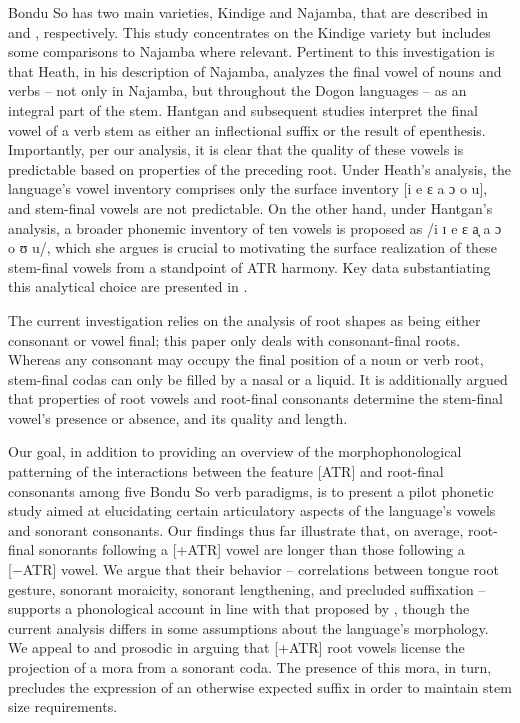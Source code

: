 \documentclass[output=paper,colorlinks,citecolor=brown]{langscibook}
\begin{document}
Bondu So has two main varieties, Kindige and Najamba, that are described in  \citet{hantgan2013kindigue} and \citet{HeathBS2017}, respectively. This study concentrates on the Kindige variety but includes some comparisons to Najamba where relevant. Pertinent to this investigation is that Heath, in his description of Najamba, analyzes the final vowel of nouns and verbs -- not only in Najamba, but throughout the Dogon languages -- as an integral part of the stem. Hantgan and subsequent studies \citep{HantganDavis, GreenHantgan} interpret the final vowel of a verb stem as either an inflectional suffix or the result of epenthesis. Importantly, per our analysis, it is clear that the quality of these vowels is predictable based on properties of the preceding root. Under Heath's analysis, the language's vowel inventory comprises only the surface inventory [i e ɛ a ɔ o u], and stem-final vowels are not predictable. On the other hand, under Hantgan's analysis, a broader phonemic inventory of ten vowels is proposed as /i ɪ e ɛ a̘ a ɔ o ʊ u/, which she argues is crucial to motivating the  surface realization of these stem-final vowels from a standpoint of ATR harmony. Key data substantiating this analytical choice are presented in \citet{HantganDavis}.

The current investigation relies on the analysis of root shapes as being either consonant or vowel final; this paper only deals with consonant-final roots. Whereas any consonant may occupy the final position of a noun or verb root, stem-final codas can only be filled by a nasal or a liquid. It is additionally argued that properties of root vowels and root-final consonants determine the stem-final vowel's presence or absence, and its quality and length.

Our goal, in addition to providing an overview of the morphophonological patterning of the interactions between the feature [ATR] and root-final consonants among five Bondu So verb paradigms, is to present a pilot phonetic study aimed at elucidating certain articulatory aspects of the language's vowels and sonorant consonants. Our findings thus far illustrate that, on average, root-final sonorants following a [+ATR] vowel are longer than those following a [−ATR] vowel. We argue that their behavior – correlations between tongue root gesture, sonorant moraicity, sonorant lengthening, and precluded suffixation – supports a phonological account in line with that proposed by \citet{GreenHantgan}, though the current analysis differs in some assumptions about the language's morphology. We appeal to  and prosodic  in arguing that [+ATR] root vowels license the projection of a mora from a sonorant coda. The presence of this mora, in turn, precludes the expression of an otherwise expected suffix in order to maintain stem size requirements. 
\end{document}

